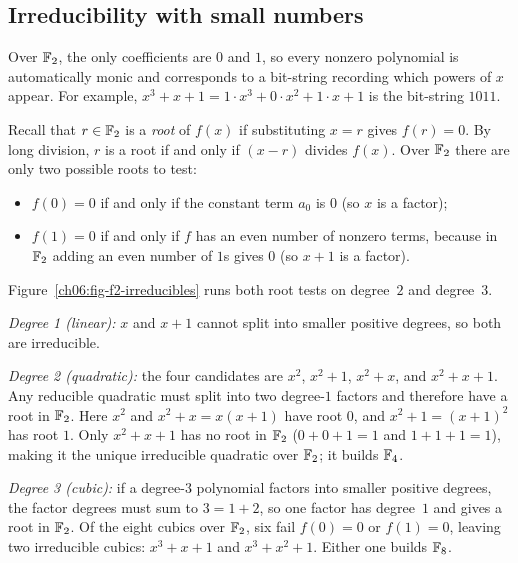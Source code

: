 \subsection{Irreducibility with small numbers}

Over $\mathbb{F}_2$, the only coefficients are $0$ and $1$, so every nonzero polynomial
is automatically monic and corresponds to a bit-string recording which powers
of $x$ appear. For example, $x^3 + x + 1 = 1\cdot x^3 + 0\cdot x^2 + 1\cdot x +
1$ is the bit-string $1011$.

Recall that $r \in \mathbb{F}_2$ is a \emph{root} of $f(x)$ if substituting $x = r$
gives $f(r) = 0$. By long division, $r$ is a root if and only if $(x - r)$
divides $f(x)$. Over $\mathbb{F}_2$ there are only two possible roots to test:
\begin{itemize}
  \item $f(0) = 0$ if and only if the constant term $a_0$ is $0$ (so $x$ is a
        factor);
  \item $f(1) = 0$ if and only if $f$ has an even number of nonzero terms,
        because in $\mathbb{F}_2$ adding an even number of $1$s gives $0$ (so $x + 1$
        is a factor).
\end{itemize}

\begin{example}
\label{ch06:ex-irreducibles}
Figure~\ref{ch06:fig-f2-irreducibles} runs both root tests on degree~$2$ and
degree~$3$.

\emph{Degree 1 (linear):} $x$ and $x+1$ cannot split into smaller positive
degrees, so both are irreducible.

\emph{Degree 2 (quadratic):} the four candidates are $x^2$, $x^2+1$, $x^2+x$,
and $x^2+x+1$. Any reducible quadratic must split into two degree-$1$ factors
and therefore have a root in $\mathbb{F}_2$. Here $x^2$ and $x^2+x = x(x+1)$ have root
$0$, and $x^2+1 = (x+1)^2$ has root $1$. Only $x^2+x+1$ has no root in $\mathbb{F}_2$
($0+0+1=1$ and $1+1+1=1$), making it the unique irreducible quadratic over
$\mathbb{F}_2$; it builds $\mathbb{F}_4$.

\emph{Degree 3 (cubic):} if a degree-$3$ polynomial factors into smaller
positive degrees, the factor degrees must sum to $3 = 1 + 2$, so one factor has
degree~$1$ and gives a root in $\mathbb{F}_2$. Of the eight cubics over $\mathbb{F}_2$, six fail
$f(0)=0$ or $f(1)=0$, leaving two irreducible cubics: $x^3+x+1$ and
$x^3+x^2+1$. Either one builds $\mathbb{F}_8$.
\end{example}

